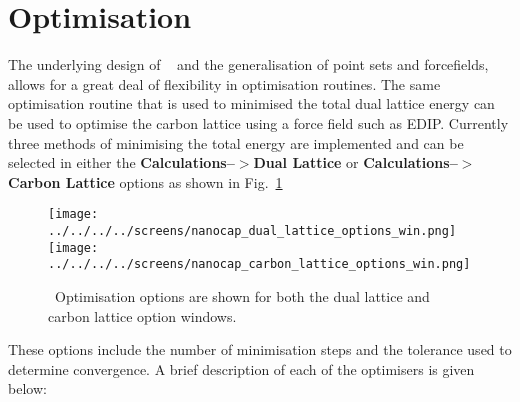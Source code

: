 \section{Optimisation}\label{Optimisation}

The underlying design of \nanocap~ and the generalisation of point sets and forcefields, allows for a great deal of flexibility in optimisation routines. The same optimisation routine that is used to minimised the total dual lattice energy can be used to optimise the carbon lattice using a force field such as EDIP. Currently three methods of minimising the total energy are implemented and can be selected in either the  \textbf{Calculations--$>$Dual Lattice} or  \textbf{Calculations--$>$Carbon Lattice} options as shown in Fig.~\ref{optimisation_options}

 \begin{figure}[h!]
\centering
\texttt{[image: ../../../../screens/nanocap\_dual\_lattice\_options\_win.png]}
\texttt{[image: ../../../../screens/nanocap\_carbon\_lattice\_options\_win.png]}
\caption{\nanocap~Optimisation options are shown for both the dual lattice and carbon lattice option windows.}
\label{optimisation_options}
\end{figure}

These options include the number of minimisation steps and the tolerance used to determine convergence. A brief description of each of the optimisers is given below:

